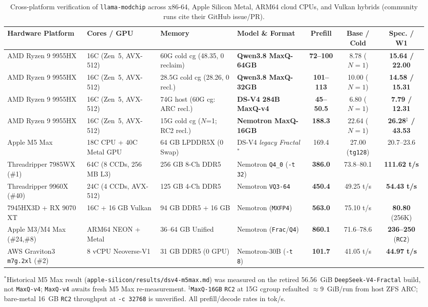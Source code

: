 \documentclass[10pt,twocolumn]{article}
\begin{document}
\begin{table}[t]
\centering
\caption{Cross-platform verification of \texttt{llama-modchip} across x86-64, Apple Silicon Metal, ARM64 cloud CPUs, and Vulkan hybrids (community runs cite their GitHub issue/PR).}
\label{tab:platforms}
\scriptsize
\setlength{\tabcolsep}{2.6pt}
\begin{tabularx}{\textwidth}{@{}lLLlccc@{}}
\toprule
\textbf{Hardware Platform} & \textbf{Cores / GPU} & \textbf{Memory} & \textbf{Model \& Format} & \textbf{Prefill} & \textbf{Base / Cold} & \textbf{Spec. / W1} \\
\midrule
AMD Ryzen 9 9955HX & 16C (Zen~5, AVX-512) & 60G cold cg (48.35, 0 reclaim) & \textbf{Qwen3.8 MaxQ-64GB} & \textbf{72--100} & 8.78 ($N=1$) & \textbf{15.64 / 22.00} \\
AMD Ryzen 9 9955HX & 16C (Zen~5, AVX-512) & 28.5G cold cg (28.26, 0 recl.) & \textbf{Qwen3.8 MaxQ-32GB} & \textbf{101--113} & 10.00 ($N=1$) & \textbf{14.58 / 15.31} \\
AMD Ryzen 9 9955HX & 16C (Zen~5, AVX-512) & 74G host (60G cg: ARC recl.) & \textbf{DS-V4 284B MaxQ-v4} & \textbf{45--50.5} & 6.80 ($N=1$) & \textbf{7.79 / 12.31} \\
AMD Ryzen 9 9955HX & 16C (Zen~5, AVX-512) & 15G cold cg ($N$=1; RC2 recl.) & \textbf{Nemotron MaxQ-16GB} & \textbf{188.3} & 22.64 ($N=1$) & \textbf{26.28$^\ddagger$ / 43.53} \\
Apple M5 Max & 18C CPU + 40C Metal GPU & 64 GB LPDDR5X (0 Swap) & DS-V4 \textit{legacy Fractal}$^*$ & 169.4 & 27.00 (\texttt{tg128}) & 20.7--23.6 \\
Threadripper 7985WX (\#1) & 64C (8 CCDs, 256 MB L3) & 256 GB 8-Ch DDR5 & Nemotron \texttt{Q4\_0} (\texttt{-t 32}) & \textbf{386.0} & 73.8--80.1 & \textbf{111.62 t/s} \\
Threadripper 9960X (\#40) & 24C (4 CCDs, AVX-512) & 125 GB 4-Ch DDR5 & Nemotron \texttt{VQ3-64} & \textbf{450.4} & 49.25 t/s & \textbf{54.43 t/s} \\
7945HX3D + RX 9070 XT & 16C + 16 GB Vulkan & 94 GB DDR5 + 16 GB & Nemotron (\texttt{MXFP4}) & \textbf{563.0} & 75.10 t/s & \textbf{80.80} (256K) \\
Apple M3/M4 Max (\#24,\#8) & ARM64 NEON + Metal & 36--64 GB Unified & Nemotron (\texttt{Frac}/\texttt{Q4}) & \textbf{860.1} & 71.6--78.6 & \textbf{236--250} (\texttt{RC2}) \\
AWS Graviton3 \texttt{m7g.2xl} (\#2) & 8 vCPU Neoverse-V1 & 31 GB DDR5 (0 GPU) & Nemotron-30B (\texttt{-t 8}) & \textbf{101.7} & 41.05 t/s & \textbf{44.97 t/s} \\
\bottomrule
\end{tabularx}
\vspace{2pt}
\raggedright\scriptsize $^*$Historical M5 Max result (\texttt{apple-silicon/results/dsv4-m5max.md}) was measured on the retired 56.56~GiB \texttt{DeepSeek-V4-Fractal} build, not \texttt{MaxQ-v4}; \texttt{MaxQ-v4} awaits fresh M5 Max re-measurement. $^\ddagger$\texttt{MaxQ-16GB} \texttt{RC2} at 15G cgroup refaulted ${\approx}9$~GiB/run from host ZFS ARC; bare-metal 16~GB \texttt{RC2} throughput at \texttt{-c 32768} is unverified. All prefill/decode rates in tok/s.
\end{table}
\end{document}
